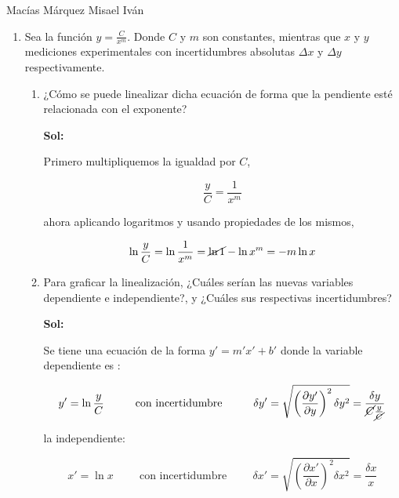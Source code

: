 \documentclass[12pt,a4paper]{article}
\begin{document}
Macías Márquez Misael Iván

\begin{enumerate}






\item Sea la función $y = \frac{C}{x^m}$. Donde $C$ y $m$ son constantes, mientras que $x$ y $y$ mediciones experimentales con incertidumbres absolutas $\Delta x$ y $\Delta y$ respectivamente.

\begin{enumerate}
    \item ¿Cómo se puede linealizar dicha ecuación de forma que la pendiente esté relacionada con el exponente?
    
    \textbf{Sol:}
    
    Primero multipliquemos la igualdad por $C$,
    
    \begin{equation*}
        \frac{y}{C} = \frac{1}{x^m}
    \end{equation*}
    
    ahora aplicando logaritmos y usando propiedades de los mismos,
    
    \begin{equation*}
        \ln{\frac{y}{C}} = \ln{\frac{1}{x^m}} = \cancel{\ln{1}} - \ln{x^m} = -m \ln{x}
    \end{equation*}
    
    \item Para graficar la linealización, ¿Cuáles serían las nuevas variables dependiente e independiente?, y  ¿Cuáles sus respectivas incertidumbres?
    
    \textbf{Sol:}
    
    Se tiene una ecuación de la forma $y' = m' x' + b'$ donde la variable dependiente es :
    
    \begin{equation*}
        y' = \ln{\frac{y}{C}} \hspace{1cm} \text{con incertidumbre} \hspace{1cm} \delta y' = \sqrt{\left(\frac{\partial y'}{\partial y}\right)^2 \delta y^2 }=\frac{\delta y}{\cancel{C}  \frac{y}{\cancel{C}}}
    \end{equation*}
    
    la independiente:
    
    \begin{equation*}
        x'= \ln{x} \hspace{1cm} \text{con incertidumbre} \hspace{1cm} \delta x' =\sqrt{ \left(\frac{\partial x'}{\partial x}\right)^2 \delta x^2} =\frac{\delta x}{x} 
    \end{equation*}
    

\end{enumerate}
\end{enumerate}
\end{document}
